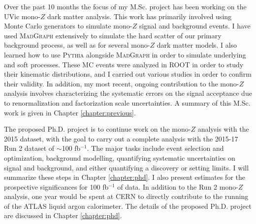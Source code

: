 \label{chapter:introduction}

Over the past 10 months the focus of my M.Sc. project has been working on the UVic mono-$Z$ dark matter analysis. This work has primarily involved using Monte Carlo generators to simulate mono-$Z$ signal and background events. I have used \textsc{MadGraph} extensively to simulate the hard scatter of our primary background process, as well as for several mono-$Z$ dark matter models. I also learned how to use \textsc{Pythia} alongside \textsc{MadGraph} in order to simulate underlying and soft processes. These MC events were analyzed in ROOT in order to study their kinematic distributions, and I carried out various studies in order to confirm their validity. In addition, my most recent, ongoing contribution to the mono-$Z$ analysis involves characterizing the systematic errors on the signal acceptance due to renormalization and factorization scale uncertainties. A summary of this M.Sc. work is given in Chapter \ref{chapter:previous}. 

The proposed Ph.D. project is to continue work on the mono-$Z$ analysis with the 2015 dataset, with the goal to carry out a complete analysis with the 2015-17 Run 2 dataset of $\sim$100 fb$^{-1}$. The major tasks include event selection and optimization, background modelling, quantifying systematic uncertainties on signal and background, and either quantifying a discovery or setting limits. I will summarize these steps in Chapter \ref{chapter:phd}. I also present estimates for the prospective significances for 100 fb$^{-1}$ of data. In addition to the Run 2 mono-$Z$ analysis, one year would be spent at CERN to directly contribute to the running of the ATLAS liquid argon calorimeter. The details of the proposed Ph.D. project are discussed in Chapter \ref{chapter:phd}.